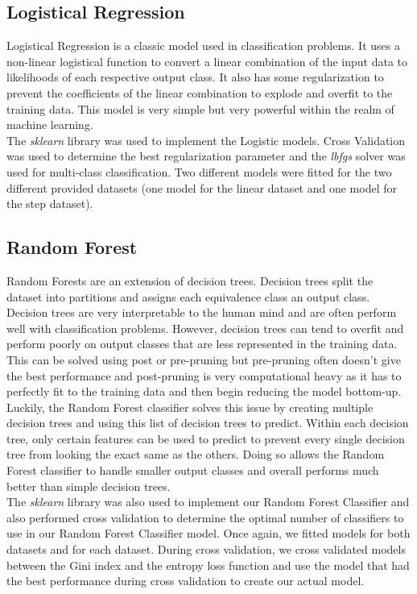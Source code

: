 \documentclass[conference]{IEEEtran}
\begin{document}
\subsection{Logistical Regression}

Logistical Regression is a classic model used in classification problems. It uses a non-linear logistical function to convert a linear combination of the input data to likelihoods of each respective output class. It also has some regularization to prevent the coefficients of the linear combination to explode and overfit to the training data. This model is very simple but very powerful within the realm of machine learning. \\

The \emph{sklearn} library was used to implement the Logistic models. Cross Validation was used to determine the best regularization parameter and the \emph{lbfgs} solver was used for multi-class classification. Two different models were fitted for the two different provided datasets (one model for the linear dataset and one model for the step dataset). \\

\subsection{Random Forest}

Random Forests are an extension of decision trees. Decision trees split the dataset into partitions and assigns each equivalence class an output class. Decision trees are very interpretable to the human mind and are often perform well with classification problems. However, decision trees can tend to overfit and perform poorly on output classes that are less represented in the training data. This can be solved using post or pre-pruning but pre-pruning often doesn't give the best performance and post-pruning is very computational heavy as it has to perfectly fit to the training data and then begin reducing the model bottom-up. Luckily, the Random Forest classifier solves this issue by creating multiple decision trees and using this list of decision trees to predict. Within each decision tree, only certain features can be used to predict to prevent every single decision tree from looking the exact same as the others. Doing so allows the Random Forest classifier to handle smaller output classes and overall performs much better than simple decision trees. \\

The \emph{sklearn} library was also used to implement our Random Forest Classifier and also performed cross validation to determine the optimal number of classifiers to use in our Random Forest Classifier model. Once again, we fitted models for both datasets and for each dataset. During cross validation, we cross validated models between the Gini index and the entropy loss function and use the model that had the best performance during cross validation to create our actual model. \\
\end{document}
